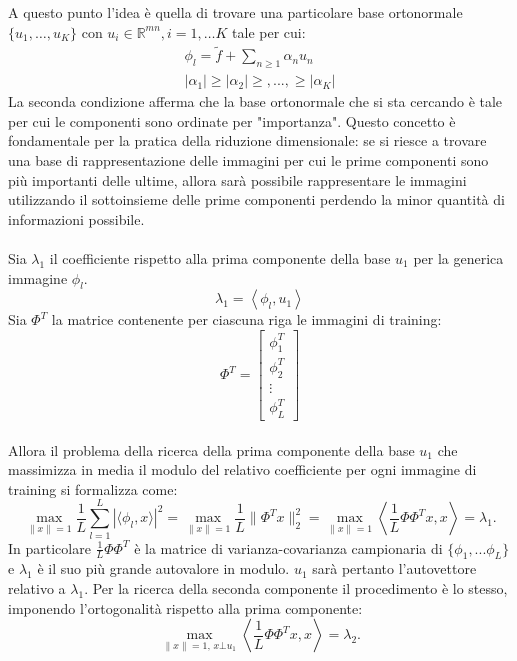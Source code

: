  \noindent A questo punto l'idea è quella di trovare una particolare base ortonormale \(\{u_1, \dots,u_{K}\}\) con \(u_i \in \mathbb{R}^{mn}, i=1,\dots K\) tale per cui:
\begin{eqnarray*}
    \phi_l = \tilde{f} +  \sum \limits_{n\geq 1} \alpha_n u_n \\
|\alpha_1| \geq |\alpha_2| \geq, ..., \geq |\alpha_{K}|
\end{eqnarray*}
La seconda condizione afferma che la base ortonormale che si sta cercando è tale per cui le componenti sono ordinate per "importanza". Questo concetto è fondamentale per la pratica della riduzione dimensionale: se si riesce a trovare una base di rappresentazione delle immagini per cui le prime componenti sono più importanti delle ultime, allora sarà possibile rappresentare le immagini utilizzando il sottoinsieme delle prime componenti perdendo la minor quantità di informazioni possibile.
\\
\\
Sia \(\lambda_1\) il coefficiente rispetto alla prima componente della base \(u_1\) per la generica immagine \(\phi_l\). 
\[
    \lambda_1 = \left\langle\phi_l, u_1 \right\rangle  
    \]
Sia \(\Phi^T\) la matrice contenente per ciascuna riga le immagini di training:
\[\Phi^T = \begin{bmatrix}
    \phi_1^T \\
    \phi_2^T \\
    \vdots \\
    \phi_L^T
\end{bmatrix}
    \]
\\
Allora il problema della ricerca della prima componente della base \(u_1\) che massimizza in media il modulo del relativo coefficiente per ogni immagine di training si formalizza come:
\begin{equation}
    \max_{\| x \| = 1 } \frac{1}{L}  \sum \limits_{l=1}^{L} | \langle \phi_l, x\rangle|^2 = \max_{\| x \| = 1 } \frac{1}{L} \| \Phi^T x \| ^2_2 = \max_{\| x \| = 1 } \left\langle \frac{1}{L}\Phi \Phi^T x, x \right\rangle = \lambda_1.
\end{equation}
In particolare \(\frac{1}{L}\Phi \Phi^T\) è la matrice di varianza-covarianza campionaria di \(\{\phi_1, ... \phi_L\}\) e \(\lambda_1\) è il suo più grande autovalore in modulo. \(u_1\) sarà pertanto l'autovettore relativo a \(\lambda_1\).
Per la ricerca della seconda componente il procedimento è lo stesso, imponendo l'ortogonalità rispetto alla prima componente:
\[
    \max_{\|x\| = 1, \, x \bot u_1 } \left\langle \frac{1}{L}\Phi \Phi^T x, x \right\rangle = \lambda_2.
\]
